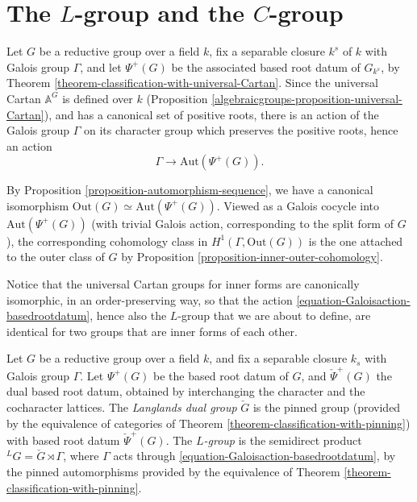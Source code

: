 \section{The $L$-group and the $C$-group}
\label{section-Lgroup}

Let $G$ be a reductive group over a field $k$, fix a separable closure $k^s$ of $k$ with Galois group $\Gamma$, and let $\Psi^+(G)$ be the associated based root datum of $G_{k^s}$, by Theorem \ref{theorem-classification-with-universal-Cartan}. Since the universal Cartan $\mathbb A^G$ is defined over $k$ (Proposition \ref{algebraicgroups-proposition-universal-Cartan}), and has a canonical set of positive roots, there is an action of the Galois group $\Gamma$ on its character group which preserves the positive roots, hence an action 
\begin{equation}
 \label{equation-Galoisaction-basedrootdatum}
\Gamma \to \text{Aut}(\Psi^+(G)).
\end{equation}

\begin{remark}
 \label{remark-Galoisaction-basedrootdatum}
By Proposition \ref{proposition-automorphism-sequence}, we have a canonical isomorphism $\text{Out}(G) \simeq \text{Aut}(\Psi^+(G))$. 
Viewed as a Galois cocycle into  $\text{Aut}(\Psi^+(G))$ (with trivial Galois action, corresponding to the split form of $G$), the corresponding cohomology class in $H^1(\Gamma, \text{Out}(G))$ is the one attached to the outer class of $G$ by Proposition \ref{proposition-inner-outer-cohomology}. 

Notice that the universal Cartan groups for inner forms are canonically isomorphic, in an order-preserving way, so that the action \eqref{equation-Galoisaction-basedrootdatum}, hence also the $L$-group that we are about to define, are identical for two groups that are inner forms of each other.
\end{remark}


\begin{definition}
 \label{definition-Lgroup}
Let $G$ be a reductive group over a field $k$, and fix a separable closure $k_s$ with Galois group $\Gamma$. Let $\Psi^+(G)$ be the based root datum of $G$, and $\check\Psi^+(G)$ the dual based root datum, obtained by interchanging the character and the cocharacter lattices. The {\it Langlands dual group} $\check G$ is the pinned group (provided by the equivalence of categories of Theorem \ref{theorem-classification-with-pinning}) with based root datum $\check\Psi^+(G)$. The {\it $L$-group} is the semidirect product ${^LG}=\check G \rtimes\Gamma$, where $\Gamma$ acts through \eqref{equation-Galoisaction-basedrootdatum}, by the pinned automorphisms provided by the equivalence of Theorem \ref{theorem-classification-with-pinning}. 
\end{definition}

